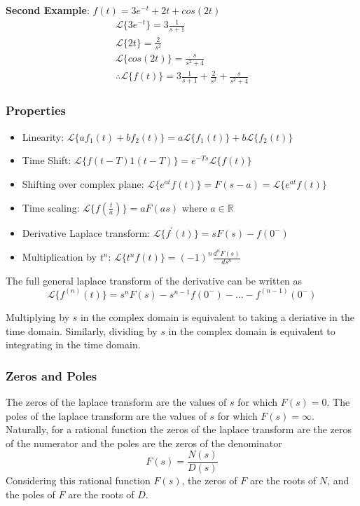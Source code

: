 \documentclass[11pt]{article}
\begin{document}
\textbf{Second Example}: $f(t) = 3e^{-t} + 2t + cos (2t)$
\begin{gather}
  \mathcal{L}\{ 3e^{-t} \} = 3 \frac{1}{s+1} \\
  \mathcal{L}\{ 2t \} = \frac{2}{s^2} \\
  \mathcal{L}\{ cos (2t) \} = \frac{s}{s^2 + 4} \\
  \therefore
  \mathcal{L}\{ f(t) \} = 3 \frac{1}{s+1} + \frac{2}{s^2} + \frac{s}{s^2 + 4}
\end{gather}



\subsubsection{Properties}
\begin{itemize}
  \item Linearity: $\mathcal{L} \{ a f_1(t) + b f_2(t) \} = a \mathcal{L} \{ f_1(t) \} + b \mathcal{L} \{ f_2(t) \} $
  \item Time Shift: $\mathcal{L} \{ f(t-T)1(t-T) \}  = e^{-Ts} \mathcal{L} \{ f(t) \}$
  \item Shifting over complex plane: $\mathcal{L} \{ e^{at} f(t) \} = F(s-a) = \mathcal{L} \{ e^{at} f(t) \}$
  \item Time scaling: $\mathcal{L} \{ f(\frac{t}{a}) \} = a F(as)$ where $a \in \mathbb{R}$
  \item Derivative Laplace transform: $\mathcal{L} \{f^\prime (t)\} = sF(s) - f(0^{-}) $
  \item Multiplication by $t^n$: $\mathcal{L} \{ t^n f(t) \} = (-1)^n \frac{d^n F(s)}{d s^n } $
\end{itemize}

The full general laplace transform of the derivative can be written as 
\begin{equation}
  \mathcal{L} \{ f^{(n)} (t) \} = s^n F(s) - s^{n-1} f(0^-) - \dots - f^{(n-1)} (0^-)
\end{equation}

Multiplying by $s$ in the complex domain is equivalent to taking a deriative in the time domain.
Similarly, dividing by $s$ in the complex domain is equivalent to integrating in the time domain.

\subsubsection{Zeros and Poles}
The zeros of the laplace transform are the values of $s$ for which $F(s) = 0$.
The poles of the laplace transform are the values of $s$ for which $F(s) = \infty$.
Naturally, for a rational function the zeros of the laplace transform are the zeros of the numerator and the poles are the zeros of the denominator
\begin{equation}
  F(s) = \frac{N(s)}{D(s)}
\end{equation}
Considering this rational function $F(s)$, the zeros of $F$ are the roots of $N$, and the poles of $F$ are the roots of $D$.
\end{document}

